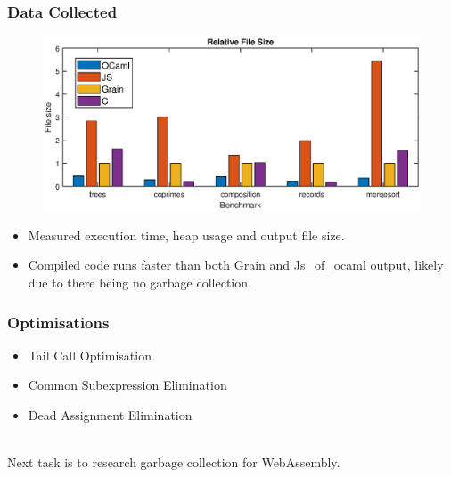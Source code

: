 \documentclass{beamer}
\begin{document}

\begin{frame}\frametitle{Data Collected}
\vspace{-1cm}
\begin{figure}
    \hspace*{-0.5in}
    \includegraphics[scale=0.6]{filesize}
\end{figure}
\begin{itemize}
\item Measured execution time, heap usage and output file size.
\item Compiled code runs faster than both Grain and Js\_of\_ocaml output, likely due to there being no garbage collection.
\end{itemize}
\end{frame}

\begin{frame}\frametitle{Optimisations} 
\begin{itemize}
\item Tail Call Optimisation %
\item Common Subexpression Elimination %
\item Dead Assignment Elimination %
\end{itemize}
\text{}\\

Next task is to research garbage collection for WebAssembly.
\end{frame}




\end{document}
